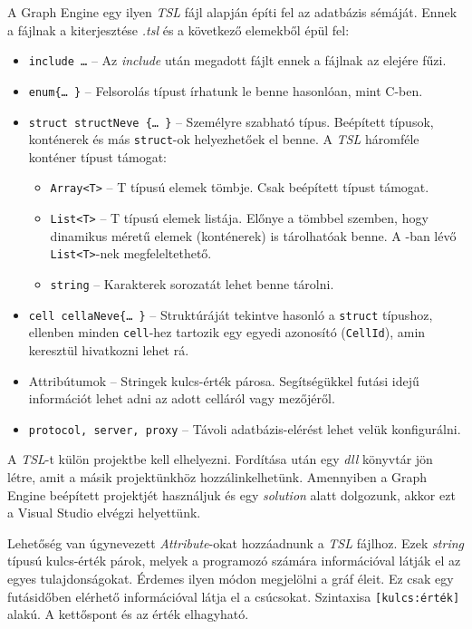A Graph Engine egy ilyen \emph{TSL} fájl alapján építi fel az adatbázis sémáját. Ennek a fájlnak a kiterjesztése \emph{.tsl} és a következő elemekből épül fel:
\begin{itemize}
	\item \texttt{include \ldots{}} \--- Az \emph{include} után megadott fájlt ennek a fájlnak az elejére fűzi.
	\item \texttt{enum\{\ldots{} \}} \--- Felsorolás típust írhatunk le benne hasonlóan, mint C-ben.
	\item \texttt{struct structNeve \{\ldots{} \}} \--- Személyre szabható típus. Beépített típusok, konténerek és más \texttt{struct}-ok helyezhetőek el benne. A \emph{TSL} háromféle konténer típust támogat:
	\begin{itemize}
		\item \texttt{Array<T>} \--- T típusú elemek tömbje. Csak beépített típust támogat.
		\item \texttt{List<T>} \--- T típusú elemek listája. Előnye a tömbbel szemben, hogy dinamikus méretű elemek (konténerek) is tárolhatóak benne. A \Csh{}-ban lévő \texttt{List<T>}-nek megfeleltethető.
		 \item \texttt{string} \--- Karakterek sorozatát lehet benne tárolni.
	\end{itemize}
	\item \texttt{cell cellaNeve\{\ldots{} \}} \--- Struktúráját tekintve hasonló a \texttt{struct} típushoz, ellenben minden \texttt{cell}-hez tartozik egy egyedi azonosító (\texttt{CellId}), amin keresztül hivatkozni lehet rá. 
	\item Attribútumok \--- Stringek kulcs-érték párosa. Segítségükkel futási idejű információt lehet adni az adott celláról vagy mezőjéről.
	\item \texttt{protocol, server, proxy} \--- Távoli adatbázis-elérést lehet velük konfigurálni.
\end{itemize}

A \emph{TSL}-t külön projektbe kell elhelyezni. Fordítása után egy \emph{dll} könyvtár jön létre, amit a másik \Csh{} projektünkhöz hozzálinkelhetünk. Amennyiben a Graph Engine beépített projektjét használjuk és egy \emph{solution} alatt dolgozunk, akkor ezt a Visual Studio elvégzi helyettünk.

Lehetőség van úgynevezett \emph{Attribute}-okat hozzáadnunk a \emph{TSL} fájlhoz. Ezek \emph{string} típusú kulcs-érték párok, melyek a programozó számára információval látják el az egyes tulajdonságokat. Érdemes ilyen módon megjelölni a gráf éleit. Ez csak egy futásidőben elérhető információval látja el a csúcsokat. Szintaxisa \texttt{[kulcs:érték]} alakú. A kettőspont és az érték elhagyható.

